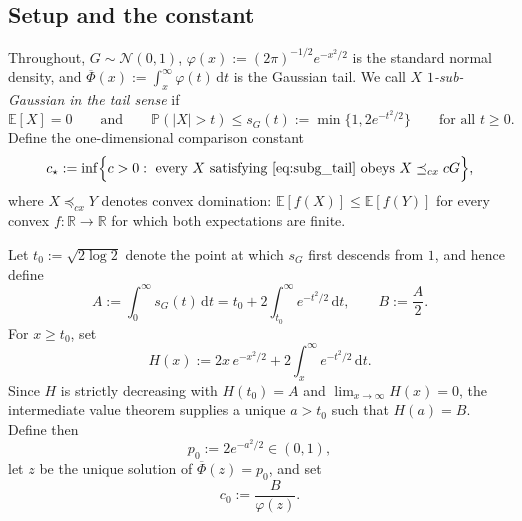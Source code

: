 \documentclass[11pt]{article}
\newcommand{\R}{\mathbb{R}}
\newcommand{\Pbb}{\mathbb{P}}
\newcommand{\Ebb}{\mathbb{E}}
\newcommand{\cN}{\mathcal{N}}
\newcommand{\phin}{\varphi}
\newcommand{\Phib}{\overline{\Phi}}
\begin{document}
\subsection*{Setup and the constant}

Throughout, $G \sim \cN (0,1)$, $\phin (x) := (2\pi)^{-1/2} e^{-x^{2}/2}$ is the standard normal density, and $\Phib(x) := \int_x^\infty \phin(t) \, \mathrm{d}t$ is the Gaussian tail.
We call $X$ \emph{$1$-sub-Gaussian in the tail sense} if
%
\begin{equation}
\label{eq:subg_tail}
\Ebb[X] = 0
\qquad\text{and}\qquad
\Pbb(|X|>t) \le s_G(t) := \min \{ 1,  2e^{-t^2/2} \} \qquad\text{for all } t \ge 0.
\end{equation}
%
Define the one-dimensional comparison constant
%
\begin{equation}
\label{eq:def_cstar}
c_\star := \inf \Bigl\{ c > 0 :\ \text{every $X$ satisfying \eqref{eq:subg_tail} obeys } X \preceq_{cx} cG \Bigr\},
\end{equation}
%
where $X\preceq_{cx}Y$ denotes convex domination: $\Ebb[f(X)] \le \Ebb[f(Y)]$ for every convex $f:\R\to\R$ for which both expectations are finite.

Let $t_0:=\sqrt{2\log 2}$ denote the point at which $s_G$ first descends from $1$, and hence define
%
\begin{equation}
\label{eq:Adef_Bdef}
A := \int_0^\infty s_G (t) \, \mathrm{d}t
= t_0 + 2 \int_{t_0}^\infty e^{-t^2/2} \, \mathrm{d}t,
\qquad
B := \frac{A}{2}.
\end{equation}
%
For $x\ge t_0$, set
%
\begin{equation}
\label{eq:Hdef}
H(x) := 2x \, e^{-x^2/2} + 2 \int_x^\infty e^{-t^2/2} \, \mathrm{d}t.
\end{equation}
%
Since $H$ is strictly decreasing with $H(t_0) = A$ and $\lim_{x\to\infty} H(x) = 0$, the intermediate value theorem supplies a unique $a > t_0$ such that $H(a) = B$. Define then
%
\begin{equation}
\label{eq:p0def}
p_0 := 2 e^{-a^2/2} \in (0,1),
\end{equation}
%
let $z$ be the unique solution of $\Phib(z) = p_0$, and set
%
\begin{equation}
\label{eq:c0def}
c_0 := \frac{B}{\phin(z)}.
\end{equation}
%
\end{document}
